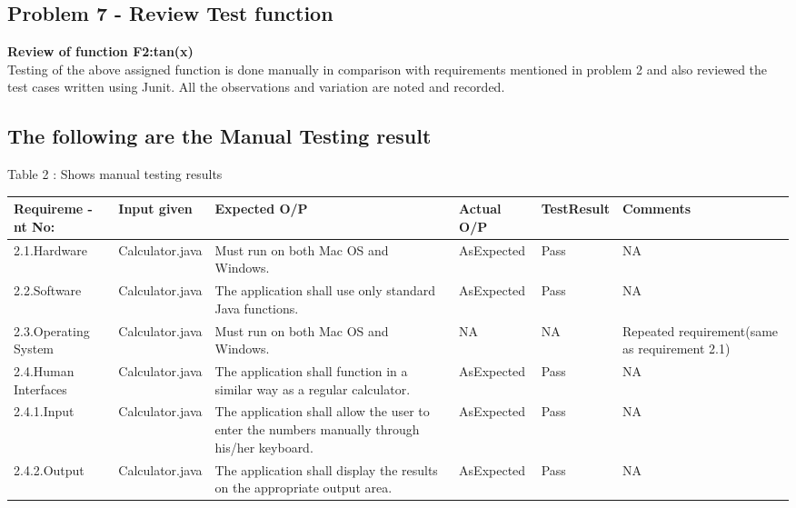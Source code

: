 \documentclass[a4paper,12pt]{article}
\begin{document}
\begin{titlepage}
\section{Problem 7 - Review Test function}
\textbf{Review of function F2:tan(x)}\\
Testing of the above assigned function is done manually in comparison with requirements mentioned in problem 2 and also reviewed the test cases written using Junit. All the observations and variation are noted and recorded. \\
\newline
\subsection{The following are the Manual Testing result} 
\begin{center}
Table 2 : Shows manual testing results 
\begin{tabular}{ | m{5em} | m{3cm}| m{3cm} | m{2cm}|m{2cm}|m{3cm}| } 
  \hline
 \textbf{Requireme -nt No:}  & \textbf{Input given} & \textbf{Expected  O/P} & \textbf{Actual O/P} & \textbf{TestResult} & \textbf{Comments}\\ 
  \hline
  2.1.Hardware  & Calculator.java  & Must run on both Mac OS and Windows. & AsExpected & Pass & NA\\ 
  \hline
  2.2.Software  & Calculator.java  & The application shall use only standard Java functions. & AsExpected & Pass & NA\\  
  \hline
   2.3.Operating System  & Calculator.java  & Must run on both Mac OS and Windows. & NA & NA & Repeated requirement(same as requirement 2.1)\\ 
  \hline
   2.4.Human Interfaces  & Calculator.java  & The application shall function in a similar way as a regular calculator. & AsExpected & Pass & NA\\
  \hline
  2.4.1.Input  & Calculator.java  & The application shall allow the user to enter the numbers manually through his/her keyboard. & AsExpected & Pass & NA\\
  \hline
  2.4.2.Output  & Calculator.java  & The application shall display the results on the appropriate output area. & AsExpected & Pass & NA\\
  \hline
\end{tabular}
\end{center}
\begin{center}
\begin{tabular}{ | m{5em} | m{3cm}| m{3cm} | m{2cm}|m{2cm}|m{3cm}| } 
  \hline

\end{tabular}
\end{center}
\end{titlepage}
\end{document}
